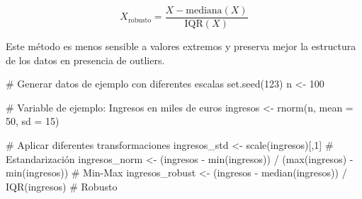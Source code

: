 \documentclass[
  letterpaper,
  DIV=11,
  numbers=noendperiod]{scrreprt}
\newenvironment{Shaded}{\begin{snugshade}}{\end{snugshade}}
\newcommand{\AttributeTok}[1]{\textcolor[rgb]{0.40,0.45,0.13}{#1}}
\newcommand{\CommentTok}[1]{\textcolor[rgb]{0.37,0.37,0.37}{#1}}
\newcommand{\DecValTok}[1]{\textcolor[rgb]{0.68,0.00,0.00}{#1}}
\newcommand{\FunctionTok}[1]{\textcolor[rgb]{0.28,0.35,0.67}{#1}}
\newcommand{\NormalTok}[1]{\textcolor[rgb]{0.00,0.23,0.31}{#1}}
\newcommand{\OtherTok}[1]{\textcolor[rgb]{0.00,0.23,0.31}{#1}}
\newcommand{\SpecialCharTok}[1]{\textcolor[rgb]{0.37,0.37,0.37}{#1}}
\begin{document}
\[X_{\text{robusto}} = \frac{X - \text{mediana}(X)}{\text{IQR}(X)}\]

Este método es menos sensible a valores extremos y preserva mejor la
estructura de los datos en presencia de outliers.

\begin{tcolorbox}[enhanced jigsaw, leftrule=.75mm, breakable, colbacktitle=quarto-callout-tip-color!10!white, bottomrule=.15mm, colframe=quarto-callout-tip-color-frame, toprule=.15mm, colback=white, coltitle=black, bottomtitle=1mm, left=2mm, title=\textcolor{quarto-callout-tip-color}{\faLightbulb}\hspace{0.5em}{Ejemplo comparativo: Escalado de variables}, opacityback=0, arc=.35mm, opacitybacktitle=0.6, toptitle=1mm, titlerule=0mm, rightrule=.15mm]

\begin{Shaded}
\begin{Highlighting}[]
\CommentTok{\# Generar datos de ejemplo con diferentes escalas}
\FunctionTok{set.seed}\NormalTok{(}\DecValTok{123}\NormalTok{)}
\NormalTok{n }\OtherTok{\textless{}{-}} \DecValTok{100}

\CommentTok{\# Variable de ejemplo: Ingresos en miles de euros}
\NormalTok{ingresos }\OtherTok{\textless{}{-}} \FunctionTok{rnorm}\NormalTok{(n, }\AttributeTok{mean =} \DecValTok{50}\NormalTok{, }\AttributeTok{sd =} \DecValTok{15}\NormalTok{)}

\CommentTok{\# Aplicar diferentes transformaciones}
\NormalTok{ingresos\_std }\OtherTok{\textless{}{-}} \FunctionTok{scale}\NormalTok{(ingresos)[,}\DecValTok{1}\NormalTok{]  }\CommentTok{\# Estandarización}
\NormalTok{ingresos\_norm }\OtherTok{\textless{}{-}}\NormalTok{ (ingresos }\SpecialCharTok{{-}} \FunctionTok{min}\NormalTok{(ingresos)) }\SpecialCharTok{/}\NormalTok{ (}\FunctionTok{max}\NormalTok{(ingresos) }\SpecialCharTok{{-}} \FunctionTok{min}\NormalTok{(ingresos))  }\CommentTok{\# Min{-}Max}
\NormalTok{ingresos\_robust }\OtherTok{\textless{}{-}}\NormalTok{ (ingresos }\SpecialCharTok{{-}} \FunctionTok{median}\NormalTok{(ingresos)) }\SpecialCharTok{/} \FunctionTok{IQR}\NormalTok{(ingresos)  }\CommentTok{\# Robusto}


\end{Highlighting}
\end{Shaded}
\end{tcolorbox}
\end{document}

